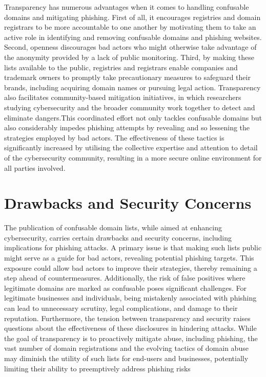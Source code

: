 Transparency has numerous advantages when it comes to handling confusable domains and mitigating phishing. First of all, it encourages registries and domain registrars to be more accountable to one another by motivating them to take an active role in identifying and removing confusable domains and phishing websites. Second, openness discourages bad actors who might otherwise take advantage of the anonymity provided by a lack of public monitoring. Third, by making these lists available to the public, registries and registrars enable companies and trademark owners to promptly take precautionary measures to safeguard their brands, including acquiring domain names or pursuing legal action. Transparency also facilitates community-based mitigation initiatives, in which researchers studying cybersecurity and the broader community work together to detect and eliminate dangers.This coordinated effort not only tackles confusable domains but also considerably impedes phishing attempts by revealing and so lessening the strategies employed by bad actors. The effectiveness of these tactics is significantly increased by utilising the collective expertise and attention to detail of the cybersecurity community, resulting in a more secure online environment for all parties involved.


\section{Drawbacks and Security Concerns} 

The publication of confusable domain lists, while aimed at enhancing cybersecurity, carries certain drawbacks and security concerns, including implications for phishing attacks. A primary issue is that making such lists public might  serve as a guide for bad actors, revealing potential phishing targets. This exposure could allow  bad actors to improve their strategies, thereby remaining a step ahead of countermeasures. Additionally, the risk of false positives where legitimate domains are  marked as confusable poses significant challenges. For legitimate businesses and individuals, being mistakenly associated with phishing can lead to unnecessary scrutiny, legal complications, and damage to their reputation. Furthermore, the tension between transparency and security raises questions about the effectiveness of these disclosures in hindering attacks. While the goal of transparency is to proactively mitigate abuse, including phishing, the vast number of domain registrations and the evolving tactics of domain abuse may diminish the utility of such lists for end-users and businesses, potentially limiting their ability to preemptively address phishing risks



